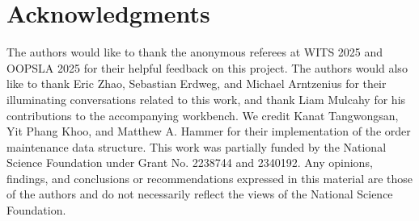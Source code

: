 \section*{Acknowledgments}
The authors would like to thank the anonymous referees at WITS 2025 and OOPSLA 2025 for their helpful feedback on this project. The authors would also like to thank Eric Zhao, Sebastian Erdweg, and Michael Arntzenius for their illuminating conversations related to this work, and thank Liam Mulcahy for his contributions to the accompanying workbench. We credit Kanat Tangwongsan, Yit Phang Khoo, and Matthew A. Hammer for their implementation of the order maintenance data structure. This work was partially funded by the National Science Foundation under Grant No. 2238744 and 2340192. Any opinions, findings, and conclusions or recommendations expressed in this material are those of the authors and do not necessarily reflect the views of the National Science Foundation.
